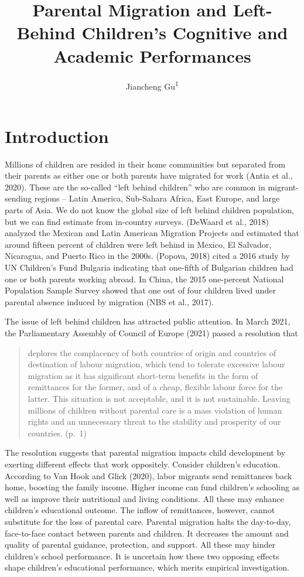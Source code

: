 \documentclass[
  man,floatsintext]{apa7}
\title{Parental Migration and Left-Behind Children's Cognitive and Academic Performances}
\author{Jiancheng Gu\textsuperscript{1}}
\date{}
\affiliation{\vspace{0.5cm}\textsuperscript{1} Faculty of Social Sciences, Vrije Universiteit Amsterdam}
\begin{document}
\maketitle

\hypertarget{introduction}{%
\section{Introduction}\label{introduction}}

Millions of children are resided in their home communities but separated from their parents as either one or both parents have migrated for work (Antia et al., 2020). These are the so-called ``left behind children'' who are common in migrant-sending regions -- Latin America, Sub-Sahara Africa, East Europe, and large parts of Asia. We do not know the global size of left behind children population, but we can find estimate from in-country surveys. (DeWaard et al., 2018) analyzed the Mexican and Latin American Migration Projects and estimated that around fifteen percent of children were left behind in Mexico, El Salvador, Nicaragua, and Puerto Rico in the 2000s. (Popova, 2018) cited a 2016 study by UN Children's Fund Bulgaria indicating that one-fifth of Bulgarian children had one or both parents working abroad. In China, the 2015 one-percent National Population Sample Survey showed that one out of four children lived under parental absence induced by migration (NBS et al., 2017).

The issue of left behind children has attracted public attention. In March 2021, the Parliamentary Assembly of Council of Europe (2021) passed a resolution that

\begin{quote}
deplores the complacency of both countries of origin and countries of destination of labour migration, which tend to tolerate excessive labour migration as it has significant short-term benefits in the form of remittances for the former, and of a cheap, flexible labour force for the latter. This situation is not acceptable, and it is not sustainable. Leaving millions of children without parental care is a mass violation of human rights and an unnecessary threat to the stability and prosperity of our countries. (p.~1)
\end{quote}

The resolution suggests that parental migration impacts child development by exerting different effects that work oppositely. Consider children's education. According to Van Hook and Glick (2020), labor migrants send remittances back home, boosting the family income. Higher income can fund children's schooling as well as improve their nutritional and living conditions. All these may enhance children's educational outcome. The inflow of remittances, however, cannot substitute for the loss of parental care. Parental migration halts the day-to-day, face-to-face contact between parents and children. It decreases the amount and quality of parental guidance, protection, and support. All these may hinder children's school performance. It is uncertain how these two opposing effects shape children's educational performance, which merits empirical investigation.
\end{document}
